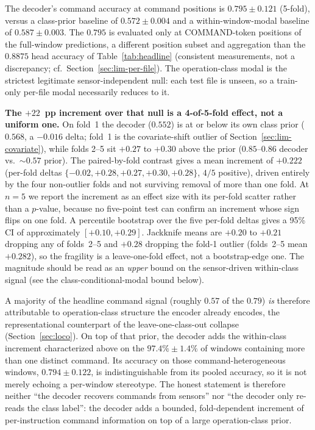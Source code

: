 \documentclass[sensors,article,submit,moreauthors,pdftex]{Definitions/mdpi}
\begin{document}
The decoder's command accuracy at command positions is $0.795 \pm 0.121$ (5-fold), versus a class-prior baseline of $0.572 \pm 0.004$ and a within-window-modal baseline of $0.587 \pm 0.003$. The $0.795$ is evaluated only at COMMAND-token positions of the full-window predictions, a different position subset and aggregation than the $0.8875$ head accuracy of Table~\ref{tab:headline} (consistent measurements, not a discrepancy; cf.\ Section~\ref{sec:lim-per-file}). The operation-class modal is the strictest legitimate sensor-independent null: each test file is unseen, so a train-only per-file modal necessarily reduces to it.

\textbf{The $+22$~pp increment over that null is a 4-of-5-fold effect, not a uniform one.} On fold~1 the decoder ($0.552$) is at or below its own class prior ($0.568$, a $-0.016$ delta; fold~1 is the covariate-shift outlier of Section~\ref{sec:lim-covariate}), while folds 2--5 sit $+0.27$ to $+0.30$ above the prior ($0.85$--$0.86$ decoder vs.\ $\sim\!0.57$ prior). The paired-by-fold contrast gives a mean increment of $+0.222$ (per-fold deltas $\{-0.02, +0.28, +0.27, +0.30, +0.28\}$, $4/5$ positive), driven entirely by the four non-outlier folds and not surviving removal of more than one fold. At $n\!=\!5$ we report the increment as an effect size with its per-fold scatter rather than a $p$-value, because no five-point test can confirm an increment whose sign flips on one fold. A percentile bootstrap over the five per-fold deltas gives a 95\% CI of approximately $[+0.10, +0.29]$. Jackknife means are $+0.20$ to $+0.21$ dropping any of folds~2--5 and $+0.28$ dropping the fold-1 outlier (folds~2--5 mean $+0.282$), so the fragility is a leave-one-fold effect, not a bootstrap-edge one. The magnitude should be read as an \emph{upper} bound on the sensor-driven within-class signal (see the class-conditional-modal bound below).

A majority of the headline command signal (roughly $0.57$ of the $0.79$) \emph{is} therefore attributable to operation-class structure the encoder already encodes, the representational counterpart of the leave-one-class-out collapse (Section~\ref{sec:loco}). On top of that prior, the decoder adds the within-class increment characterized above on the $97.4\% \pm 1.4\%$ of windows containing more than one distinct command. Its accuracy on those command-heterogeneous windows, $0.794 \pm 0.122$, is indistinguishable from its pooled accuracy, so it is not merely echoing a per-window stereotype. The honest statement is therefore neither ``the decoder recovers commands from sensors'' nor ``the decoder only re-reads the class label'': the decoder adds a bounded, fold-dependent increment of per-instruction command information on top of a large operation-class prior.
\end{document}
